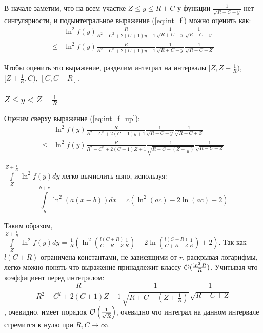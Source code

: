 В начале заметим, что на всем участке $Z \le y \le R + C$ у функции $\frac{1}{\sqrt{R - C + y}}$ нет сингулярности, и подынтегральное выражение (\ref{eq:int_f}) можно оценить как:
\begin{equation}\label{eq:int_f_up}
\begin{aligned}
       & \ln^2 f(y) \frac{R}{R^2 - C^2 + 2 (C + 1) y + 1} \frac{1}{\sqrt{R + C - y}} \frac{1}{\sqrt{R - C + y}}
\\ \le & \ln^2 f(y) \frac{R}{R^2 - C^2 + 2 (C + 1) y + 1} \frac{1}{\sqrt{R + C - y}} \frac{1}{\sqrt{R - C + Z}}
\end{aligned}
\end{equation}

Чтобы оценить это выражение, разделим интеграл на интервалы $[Z, Z + \frac{1}{R})$, $[Z + \frac{1}{R}, C)$, $[C, C + R]$.

\subsubsection{$Z \le y < Z + \frac{1}{R}$}

Оценим сверху выражение (\ref{eq:int_f_up}):
\begin{align*}
       & \ln^2 f(y) \frac{R}{R^2 - C^2 + 2 (C + 1) y + 1} \frac{1}{\sqrt{R + C - y}} \frac{1}{\sqrt{R - C + Z}}
\\ \le & \ln^2 f(y) \frac{R}{R^2 - C^2 + 2 (C + 1) Z + 1} \frac{1}{\sqrt{R + C - (Z + \frac{1}{R})}} \frac{1}{\sqrt{R - C + Z}}
\end{align*}

$\int\limits_{Z}^{Z + \frac{1}{R}} \ln^2 f(y) dy$ легко вычислить явно, используя:
\[
    \int\limits_b^{b + c} \ln^2 (a (x - b)) dx = c (\ln^2(a c) - 2 \ln (a c) + 2)
\]

Таким образом, $\int\limits_{Z}^{Z + \frac{1}{R}} \ln^2 f(y) dy = \frac{1}{R} ( \ln^2 (\frac{l(C + R)}{C + R - Z} \frac{1}{R}) - 2 \ln (\frac{l(C + R)}{C + R - Z} \frac{1}{R}) + 2)$. Так как $l(C + R)$ ограничена константами, не зависящими от $r$, раскрывая логарифмы, легко можно понять что выражение принадлежит классу $\mathcal{O}(\frac{\ln^2 R}{R})$. Учитывая что коэффициент перед интегралом:
\[
\frac{R}{R^2 - C^2 + 2 (C + 1) Z + 1} \frac{1}{\sqrt{R + C - (Z + \frac{1}{R})}} \frac{1}{\sqrt{R - C + Z}}
\]
, очевидно, имеет порядок $\mathcal{O}\left(\frac{1}{\sqrt{R}}\right)$, очевидно что интеграл на данном интервале стремится к нулю при $R, C \to \infty$.

